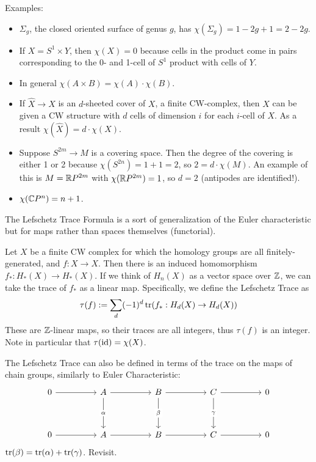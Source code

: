 \documentclass{amsart}
\begin{document}
	Examples:
	\begin{itemize}
		\item $\Sigma_g$, the closed oriented surface of genus $g$, has $\chi(\Sigma_g) = 1 - 2g + 1 = 2-2g$.
		\item If $X=S^1\times Y$, then $\chi(X)=0$ because cells in the product come in pairs corresponding to the 0- and 1-cell of $S^1$ product with cells of $Y$.
		\item In general $\chi(A\times B) = \chi(A)\cdot \chi(B)$.
		\item If $\hat{X}\to X$ is an $d$-sheeted cover of $X$, a finite CW-complex, then $\hat{X}$ can be given a CW structure with $d$ cells of dimension $i$ for each $i$-cell of $X$. As a result $\chi(\hat{X})=d\cdot \chi(X)$.
		\item Suppose $S^{2m}\to M$ is a covering space. Then the degree of the covering is either 1 or 2 because $\chi(S^{2n})=1 + 1 = 2$, so $2=d\cdot \chi(M)$. An example of this is $M=\mathbb{R} P^{2m}$ with $\chi(\mathbb{R} P^{2m})=1$, so $d=2$ (antipodes are identified!). 
		\item $\chi(\mathbb{C} P^n) = n + 1$.
	\end{itemize}
	
	\medspace
	
	The Lefschetz Trace Formula is a sort of generalization of the Euler characteristic but for maps rather than spaces themselves (functorial). 
	
	Let $X$ be a finite CW complex for which the homology groups are all finitely-generated, and $f:X\to X$. Then there is an induced homomorphism $f_*:H_*(X)\to H_*(X)$. If we think of $H_n(X)$ as a vector space over $\mathbb{Z}$, we can take the trace of $f_*$ as a linear map. Specifically, we define the Lefschetz Trace as
	$$
	\tau(f) := \sum_d (-1)^d \operatorname{tr}(f_*:H_d(X)\to H_d(X))
	$$
	These are $\mathbb{Z}$-linear maps, so their traces are all integers, thus $\tau(f)$ is an integer. Note in particular that $\tau(\operatorname{id})=\chi(X)$.
	
	The Lefschetz Trace can also be defined in terms of the trace on the maps of chain groups, similarly to Euler Characteristic:
	$$
	\begin{tikzcd}
		0 && A && B && C && 0 \\
		\\
		0 && A && B && C && 0
		\arrow[from=1-1, to=1-3]
		\arrow[from=1-3, to=1-5]
		\arrow["\alpha"{description}, from=1-3, to=3-3]
		\arrow[from=1-5, to=1-7]
		\arrow["\beta"{description}, from=1-5, to=3-5]
		\arrow[from=1-7, to=1-9]
		\arrow["\gamma"{description}, from=1-7, to=3-7]
		\arrow[from=3-1, to=3-3]
		\arrow[from=3-3, to=3-5]
		\arrow[from=3-5, to=3-7]
		\arrow[from=3-7, to=3-9]
	\end{tikzcd}
	$$
	$\operatorname{tr}(\beta)=\operatorname{tr}(\alpha)+\operatorname{tr}(\gamma)$. Revisit.\\
	
\end{document}
